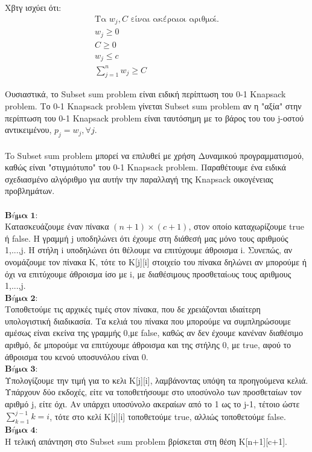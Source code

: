 \documentclass[12pt]{article}
\begin{document}
Χβτγ ισχύει ότι: \\
\begin{align*}
\text{Τα } w_{j}, C \text{ είναι ακέραιοι αριθμοί.} \\
w_{j} \geq 0 \\
C \geq 0 \\
w_{j} \leq c \\
\sum_{j=1}^{n} w_{j} \geq C
\end{align*}

Ουσιαστικά, το Subset sum problem είναι ειδική περίπτωση του 0-1 Knapsack problem. Το 0-1 Knapsack problem γίνεται Subset sum problem αν η "αξία" στην περίπτωση του 0-1 Knapsack problem είναι ταυτόσημη με το βάρος του  του j-οστού αντικειμένου, \(p_{j} = w_{j}, \forall j\). \\ \\

To Subset sum problem μπορεί να επιλυθεί με χρήση Δυναμικού προγραμματισμού, καθώς είναι "στιγμιότυπο" του 0-1 Knapsack problem. Παραθέτουμε ένα ειδικά σχεδιασμένο αλγόριθμο για αυτήν την παραλλαγή της Knapsack οικογένειας προβλημάτων.\\ \\

\(\textbf{Βήμα 1:}\) \\
Κατασκευάζουμε έναν πίνακα \((n+1) \times (c+1)\), στον οποίο καταχωρίζουμε true ή false. Η γραμμή j υποδηλώνει ότι έχουμε στη διάθεσή μας μόνο τους αριθμούς 1,...,j. Η στήλη i υποδηλώνει ότι θέλουμε να επιτύχουμε άθροισμα i. Συνεπώς, αν ονομάζουμε τον πίνακα Κ, τότε το Κ[j][i] στοιχείο του πίνακα δηλώνει αν μπορούμε ή όχι να επιτύχουμε άθροισμα ίσο με i, με διαθέσιμους προσθεταίoυς τους αριθμους 1,...,j. \\
\(\textbf{Βήμα 2:}\) \\
Τοποθετούμε τις αρχικές τιμές στον πίνακα, που δε χρειάζονται ιδιαίτερη υπολογιστική διαδικασία. Τα κελιά του πίνακα που μπορούμε να συμπληρώσουμε αμέσως είναι εκείνα της γραμμής 0,με false, καθώς αν δεν έχουμε κανέναν διαθέσιμο αριθμό, δε μπορούμε να επιτύχουμε άθροισμα και της στήλης 0, με true, αφού το άθροισμα του κενού υποσυνόλου είναι 0. \\
\(\textbf{Βήμα 3:}\) \\
Υπολογίζουμε την τιμή για το κελι Κ[j][i], λαμβάνοντας υπόψη τα προηγούμενα κελιά. Υπάρχουν δύο εκδοχές, είτε να τοποθετήσουμε στο υποσύνολο των προσθεταίων τον αριθμό j, είτε όχι. Αν υπάρχει υποσύνολο ακεραίων από το 1 ως το j-1, τέτοιο ώστε \(\sum_{k=1}^{j-1}k = i\), τότε στο κελί Κ[j][i] τοποθετούμε true, αλλιώς τοποθετούμε false. \\
\(\textbf{Βήμα 4:}\) \\
Η τελική απάντηση στο Subset sum problem βρίσκεται στη θέση Κ[n+1][c+1].
\end{document}
